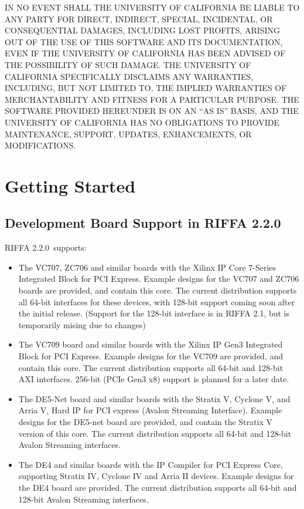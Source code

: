 \documentclass{refrep}
\newcommand{\RIFFAVer}{2.2.0}
\begin{document}
IN NO EVENT SHALL THE UNIVERSITY OF CALIFORNIA BE LIABLE TO ANY PARTY FOR
DIRECT, INDIRECT, SPECIAL, INCIDENTAL, OR CONSEQUENTIAL DAMAGES, INCLUDING LOST
PROFITS, ARISING OUT OF THE USE OF THIS SOFTWARE AND ITS DOCUMENTATION, EVEN IF
THE UNIVERSITY OF CALIFORNIA HAS BEEN ADVISED OF THE POSSIBILITY OF SUCH
DAMAGE. THE UNIVERSITY OF CALIFORNIA SPECIFICALLY DISCLAIMS ANY WARRANTIES,
INCLUDING, BUT NOT LIMITED TO, THE IMPLIED WARRANTIES OF MERCHANTABILITY AND
FITNESS FOR A PARTICULAR PURPOSE.  THE SOFTWARE PROVIDED HEREUNDER IS ON AN ``AS
IS'' BASIS, AND THE UNIVERSITY OF CALIFORNIA HAS NO OBLIGATIONS TO PROVIDE
MAINTENANCE, SUPPORT, UPDATES, ENHANCEMENTS, OR
MODIFICATIONS.

\pagebreak
\chapter{Getting Started}
\section{Development Board Support in RIFFA \RIFFAVer}
RIFFA \RIFFAVer~supports:
\begin{itemize}
\item The VC707, ZC706 and similar boards with the Xilinx IP Core 7-Series
  Integrated Block for PCI Express. Example designs for the VC707 and ZC706
  boards are provided, and contain this core. The current distribution supports
  all 64-bit interfaces for these devices, with 128-bit support coming soon
  after the initial release. (Support for the 128-bit interface is in RIFFA 2.1,
  but is temporarily mising due to changes)
\item The VC709 board and similar boards with the Xilinx IP Gen3 Integrated
  Block for PCI Express. Example designs for the VC709 are provided, and contain
  this core. The current distribution supports all 64-bit and 128-bit AXI
  interfaces. 256-bit (PCIe Gen3 x8) support is planned for a later date.
\item The DE5-Net board and similar boards with the Stratix V, Cyclone V, and
  Arria V, Hard IP for PCI express (Avalon Streaming Interface). Example designs
  for the DE5-net board are provided, and contain the Stratix V version of this
  core. The current distribution supports all 64-bit and 128-bit Avalon
  Streaming interfaces.
\item The DE4 and similar boards with the IP Compiler for PCI Express Core,
  supporting Stratix IV, Cyclone IV and Arria II devices. Example designs for
  the DE4 board are provided. The current distribution supports all 64-bit and
  128-bit Avalon Streaming interfaces.
\end{itemize}
\end{document}
